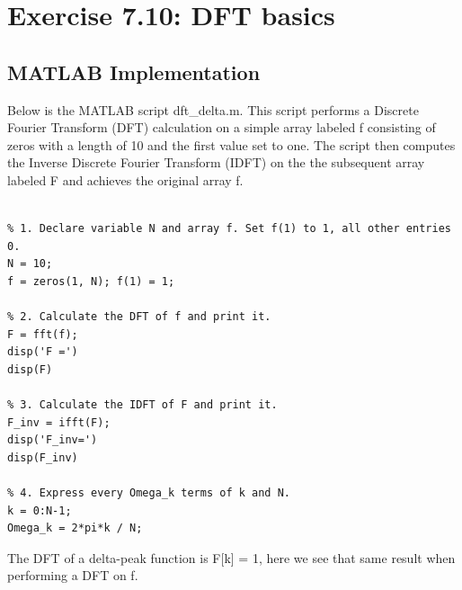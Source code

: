 
\section{Exercise 7.10: DFT basics}
\subsection{MATLAB Implementation}

Below is the MATLAB script dft\_delta.m. This script performs a Discrete Fourier Transform (DFT) calculation on a simple array labeled f consisting of zeros with a length of 10 and the first value set to one. The script then computes the Inverse Discrete Fourier Transform (IDFT) on the the subsequent array labeled F and achieves the original array f. 

\begin{lstlisting}[caption={MATLAB script \texttt{dft\_delta.m} for DFT basics}, label={lst:dft_delta}]

% 1. Declare variable N and array f. Set f(1) to 1, all other entries 0.
N = 10;
f = zeros(1, N); f(1) = 1; 

% 2. Calculate the DFT of f and print it.
F = fft(f);
disp('F =')
disp(F)

% 3. Calculate the IDFT of F and print it.
F_inv = ifft(F);
disp('F_inv=')
disp(F_inv)

% 4. Express every Omega_k terms of k and N. 
k = 0:N-1;
Omega_k = 2*pi*k / N;

\end{lstlisting}

The DFT of a delta-peak function is F[k] = 1, here we see that same result when performing a DFT on f.